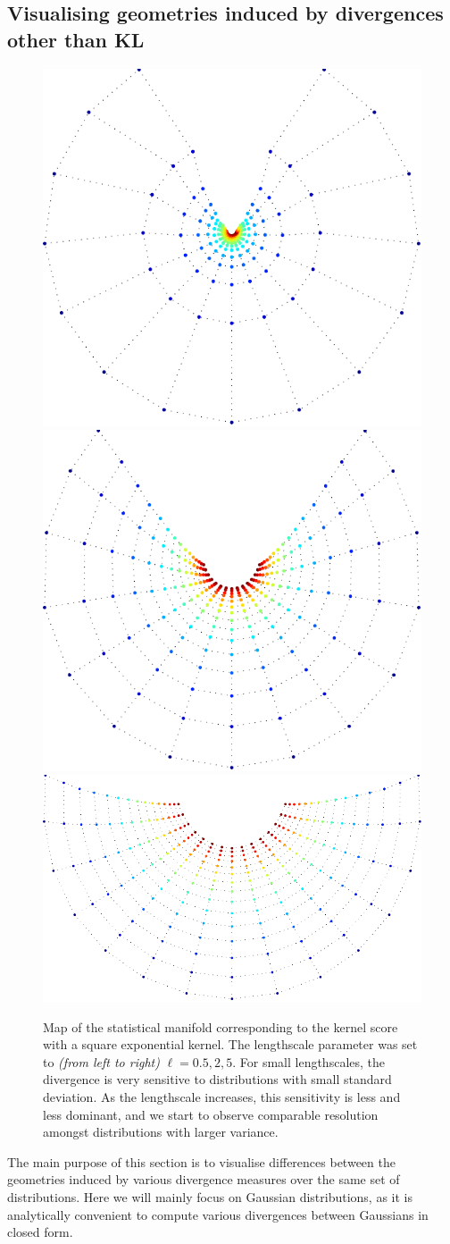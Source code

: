 \subsection{Visualising geometries induced by divergences other than KL}

\begin{figure}
	\includegraphics[width=.3\columnwidth]{figs/embeddings/Normal_kernel_1}
	\hspace{0.02\columnwidth}
	\includegraphics[width=.3\columnwidth]{figs/embeddings/Normal_kernel_2}
	\hspace{0.02\columnwidth}
	\includegraphics[width=.3\columnwidth]{figs/embeddings/Normal_kernel_3}
	\caption{Map of the statistical manifold corresponding to the kernel score with a square exponential kernel. The lengthscale parameter was set to \emph{(from left to right)} $\ell=0.5,2,5$. For small lengthscales, the divergence is very sensitive to distributions with small standard deviation. As the lengthscale increases, this sensitivity is less and less dominant, and we start to observe comparable resolution amongst distributions with larger variance.}
\end{figure}
The main purpose of this section is to visualise differences between the geometries induced by various divergence measures over the same set of distributions. Here we will mainly focus on Gaussian distributions, as it is analytically convenient to compute various divergences between Gaussians in closed form.

